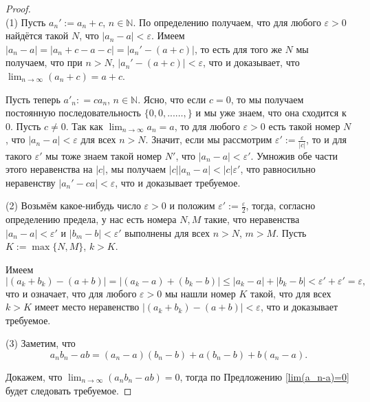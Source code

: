 \begin{proof}~\\
    (1) Пусть $a_n':=a_n+c$, $n\in \mathbb{N}$. По определению получаем, что для любого $\varepsilon > 0$ найдётся такой $N$, что $|a_n - a| < \varepsilon$. Имеем $|a_n -a| = |a_n+c - a - c| = |a_n' - (a+c)|$, то есть для того же $N$ мы получаем, что при $n>N$, $|a_n' - (a+c)| < \varepsilon$, что и доказывает, что $\lim_{n\to \infty}(a_n + c) = a+c$.

    Пусть теперь $a'_n: = ca_n$, $n\in \mathbb{N}$. Ясно, что если $c =0$, то мы получаем постоянную последовательность $\{0,0,...\ldots,\}$ и мы уже знаем, что она сходится к $0.$ Пусть $c \ne 0.$ Так как $\lim_{n\to \infty}a_n = a$, то для любого $\varepsilon>0$ есть такой номер $N$, что $|a_n - a|<\varepsilon$ для всех $n>N$. Значит, если мы рассмотрим $\varepsilon':=\frac{\varepsilon}{|c|}$, то и для такого $\varepsilon'$ мы тоже знаем такой номер $N'$, что $|a_n - a|< \varepsilon'$. Умножив обе части этого неравенства на $|c|$, мы получаем $|c||a_n - a| <|c|\varepsilon'$, что равносильно неравенству $|a_n' - ca| < \varepsilon$, что и доказывает требуемое.

    (2) Возьмём какое-нибудь число $\varepsilon>0$ и положим $\varepsilon':= \frac{\varepsilon}{2}$, тогда, согласно определению предела, у нас есть номера $N,M$ такие, что неравенства $|a_n - a|< \varepsilon'$ и $|b_m - b|<\varepsilon'$ выполнены для всех $n>N$, $m>M$. Пусть $K:=\max\{N,M\}$, $k>K$.

    Имеем
    \[
     |(a_k + b_k) - (a+b)| = |(a_k-a) + (b_k-b)|\le |a_k-a| + |b_k-b| < \varepsilon' + \varepsilon' = \varepsilon,
    \]
    что и означает, что для любого $\varepsilon>0$ мы нашли номер $K$ такой, что для всех $k>K$ имеет место неравенство $|(a_k + b_k) - (a+b)|< \varepsilon$, что и доказывает требуемое.

    (3) Заметим, что
    \[
    a_nb_n - ab = (a_n-a)(b_n-b) + a(b_n -b) + b(a_n -a).
    \]

    Докажем, что $\lim_{n\to \infty}(a_nb_n - ab) = 0$, тогда по Предложению \ref{lim(a_n-a)=0} будет следовать требуемое.


\end{proof}
